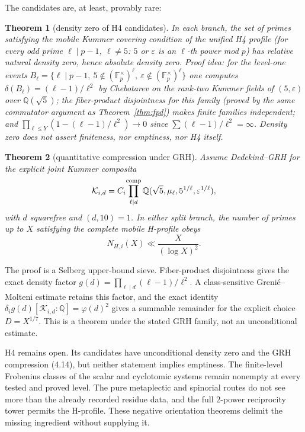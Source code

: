 \documentclass[11pt]{amsart}
\newtheorem{theorem}{Theorem}[section]
\theoremstyle{definition}
\theoremstyle{remark}
\newcommand{\F}{\mathbb{F}}
\newcommand{\Q}{\mathbb{Q}}
\newcommand{\eps}{\varepsilon}
\begin{document}
The candidates are, at least, provably rare:

\begin{theorem}[density zero of H4 candidates]\label{thm:densityzero}
In each branch, the set of primes satisfying the mobile Kummer covering
condition of the unified H4 profile (for every odd prime
$\ell \mid p-1$, $\ell \ne 5$: $5$ or $\eps$ is an $\ell$-th power
mod $p$) has relative natural density zero, hence absolute density zero.
Proof idea: for the level-one events
$B_\ell = \{\ell \mid p-1,\ 5 \notin (\F_p^\times)^\ell,\ \eps \notin
(\F_p^\times)^\ell\}$ one computes $\delta(B_\ell) = (\ell-1)/\ell^2$ by
Chebotarev on the rank-two Kummer fields of $(5, \eps)$ over
$\Q(\sqrt5)$; the fiber-product disjointness for this family (proved by
the same commutator argument as Theorem~\ref{thm:fpd}) makes finite
families independent; and
$\prod_{\ell \le Y}(1 - (\ell-1)/\ell^2) \to 0$ since
$\sum (\ell-1)/\ell^2 = \infty$. Density zero does not assert
finiteness, nor emptiness, nor H4 itself.
\end{theorem}

\begin{theorem}[quantitative compression under GRH]
\label{thm:Hcompression}
Assume Dedekind--GRH for the explicit joint Kummer composita
\[
\mathcal K_{i,d}
=C_i\!\prod_{\ell\mid d}^{\rm comp}
\Q(\sqrt5,\mu_\ell,5^{1/\ell},\eps^{1/\ell}),
\]
with $d$ squarefree and $(d,10)=1$. In either split branch, the number of
primes up to $X$ satisfying the complete mobile H-profile obeys
\[
N_{H,i}(X)\ll\frac{X}{(\log X)^2}.
\tag{4.14}
\]
\end{theorem}

The proof is a Selberg upper-bound sieve. Fiber-product disjointness gives
the exact density factor
\(g(d)=\prod_{\ell\mid d}(\ell-1)/\ell^2\). A class-sensitive
Greni\'e--Molteni estimate retains this factor, and the exact identity
\(\delta_i g(d)[\mathcal K_{i,d}:\Q]=\varphi(d)^2\) gives a summable
remainder for the explicit choice \(D=X^{1/7}\). This is a theorem under
the stated GRH family, not an unconditional estimate.

H4 remains open. Its candidates have unconditional density zero and the
GRH compression (4.14), but neither statement implies emptiness. The
finite-level Frobenius classes of the scalar and cyclotomic systems remain
nonempty at every tested and proved level. The pure metaplectic and
spinorial routes do not see more than the already recorded residue data,
and the full \(2\)-power reciprocity tower permits the H-profile. These
negative orientation theorems delimit the missing ingredient without
supplying it.
\end{document}
